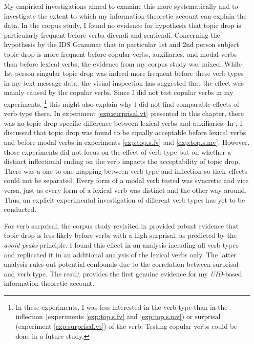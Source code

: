 My empirical investigations aimed to examine this more systematically and to investigate the extent to which my information-theoretic account can explain the data.
In the corpus study, I found no evidence for  hypothesis that topic drop is particularly frequent before verba dicendi and sentiendi.
Concerning the hypothesis by the IDS Grammar \citep{zifonun.etal1997} that in particular 1st and 2nd person subject topic drop is more frequent before copular verbs, auxiliaries, and modal verbs than before lexical verbs, the evidence from my corpus study was mixed.
While 1st person singular topic drop was indeed more frequent before these verb types in my text message data, the visual inspection has suggested that the effect was mainly caused by the copular verbs. 
Since I did not test copular verbs in my experiments,%
\footnote{In these experiments, I was less interested in the verb type than in the inflection (experiments \ref*{exp:top.s.fv} and \ref*{exp:top.s.mv}) or surprisal (experiment \ref*{exp:surprisal.vt}) of the verb.
Testing copular verbs could be done in a future study.}
%
this might also explain why I did not find comparable effects of verb type there.
In experiment \ref*{exp:surprisal.vt} presented in this chapter, there was no topic drop-specific difference between lexical verbs and auxiliaries.
In , I discussed that topic drop was found to be equally acceptable before lexical verbs and before modal verbs in experiments \ref*{exp:top.s.fv} and \ref*{exp:top.s.mv}.
However, those experiments did not focus on the effect of verb type but on whether a distinct inflectional ending on the verb impacts the acceptability of topic drop.
There was a one-to-one mapping between verb type and inflection so their effects could not be separated.
Every form of a modal verb tested  was syncretic  and vice versa, just as every form of a lexical verb was distinct and the other way around.
Thus, an explicit experimental investigation of different verb types has yet to be conducted.

For verb surprisal, the corpus  study revisited in  provided robust evidence that topic drop is less likely before verbs with a high surprisal, as predicted by the \textit{avoid peaks} principle.
I found this effect in an analysis including all verb types and replicated it in an additional analysis of the lexical verbs only.
The latter analysis rules out potential confounds due to the correlation between surprisal and verb type.
The result provides the first genuine evidence for my \textit{UID}-based information-theoretic account. 

